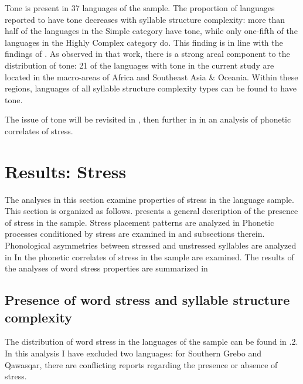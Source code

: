   Tone is present in 37 languages of the sample. The proportion of languages reported to have tone decreases with syllable structure complexity: more than half of the languages in the Simple category have tone, while only one-fifth of the languages in the Highly Complex category do. This finding is in line with the findings of \citet{Maddieson2013d}. As observed in that work, there is a strong areal component to the distribution of tone: 21 of the languages with tone in the current study are located in the macro-areas of Africa and Southeast Asia \& Oceania. Within these regions, languages of all syllable structure complexity types can be found to have tone.

  The issue of tone will be revisited in , then further in  in an analysis of phonetic correlates of stress.

\section{Results: Stress}\label{sec:5.4}

  The analyses in this section examine properties of stress in the language sample. This section is organized as follows.  presents a general description of the presence of stress in the sample. Stress placement patterns are analyzed in  Phonetic processes conditioned by stress are examined in  and subsections therein. Phonological asymmetries between stressed and unstressed syllables are analyzed in  In  the phonetic correlates of stress in the sample are examined. The results of the analyses of word stress properties are summarized in 

\subsection{Presence of word stress and syllable structure complexity}\label{sec:5.4.1}

  The distribution of word stress in the languages of the sample can be found in .2. In this analysis I have excluded two languages: for Southern Grebo and Qawasqar, there are conflicting reports regarding the presence or absence of stress.

